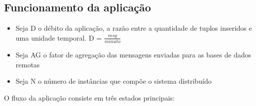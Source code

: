 \subsection{Funcionamento da aplicação} \label{func}

\begin{itemize}

\item Seja D o débito da aplicação, a razão entre a quantidade de tuplos inseridos e uma unidade temporal. D = $\frac{msg}{minuto}$
\item Seja AG o fator de agregação das mensagens enviadas para as bases de dados remotas
\item Seja N o número de instâncias que compõe o sistema distribuído

\end{itemize}


O fluxo da aplicação consiste em três estados principais:

